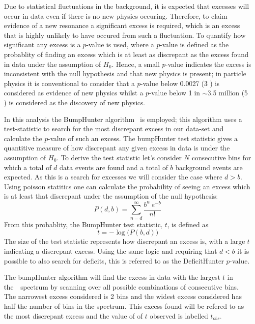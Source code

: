 Due to statistical fluctuations in the background,
it is expected that excesses will occur in data even if there is no new physics occuring.
Therefore, to claim evidence of a new resonance a significant excess is required,
which is an excess that is highly unlikely to have occured from such a fluctuation.
To quantify how significant any excess is a $p$-value is used,
where a $p$-value is defined as the probablity of finding an excess which is at least as discrepant as the excess found in data
under the assumption of $H_0$.
Hence, a small $p$-value indicates the excess is inconsistent with the null hypothesis and that new physics is present;
in particle physics it is conventional to consider that a $p$-value below 0.0027 (3 \sigma) is considered as evidence of new physics
whilst a $p$-value below 1 in $\sim$3.5 million (5 \sigma) is considered as the discovery of new physics.

In this analysis the BumpHunter algorithm~\cite{dibjet-bh} is employed;
this algorithm uses a test-statistic to 
search for the most discrepant excess in our data-set
and calculate the $p$-value of such an excess.
The bumpHunter test statistic gives a quantitive measure of how discrepant any given excess in data is
under the assumption of $H_0$.
To derive the test statistic let's consider $N$ consecutive bins for which
a total of $d$ data events are found and a total of $b$ background events are expected.
As this is a search for excesses we will consider the case where $d > b$.
Using poisson statitics one can calculate the probability of seeing an excess which is at least that discrepant
under the assumption of the null hypothesis:
\begin{equation}
  P(d,b) = \sum_{n=d}^{\infty} \frac{b^n~e^{-b}}{n!}
\end{equation}
From this probablity, the BumpHunter test statistic, $t$, is defined as
\begin{equation}
 t = -\log{\big(P(b,d)\big)}
\end{equation}
The size of the test statistic represents how discrepant an excess is,
with a large $t$ indicating a discrepant excess.
Using the same logic and requiring that $d < b$ it is possible to also search for deficits,
this is referred to as the DeficitHunter $p$-value.

The bumpHunter algorithm will find the excess in data with the largest $t$ in the~\mjj~spectrum
by scanning over all possible combinations of consecutive bins.
The narrowest excess considered is 2 bins and the widest excess considered has half the number of bins in the spectrum.
This excess found will be refered to as the most discrepant excess and the value of of $t$ observed is labelled $t_{obs}$.

